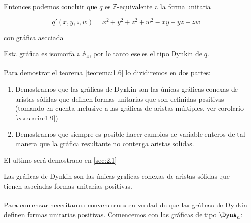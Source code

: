 \begin{example}
Entonces podemos concluir que $q$ es $\mathbb{Z}$-equivalente a la forma unitaria

\begin{equation*}
q'\left(x, y, z, w\right) = x^{2} + y^{2} + z^{2} + w^{2} - xy - yz - zw
\end{equation*}

con gráfica asociada

\begin{center}
\end{center}

Esta gráfica es isomorfa a $\mathbb{A}_{4}$, por lo tanto ese es el tipo Dynkin de $q$.
\end{example}

\paragraph{}
Para demostrar el teorema \ref{teorema:1.6} lo dividiremos en dos partes:

\begin{enumerate}
    \item Demostramos que las gráficas de Dynkin son las únicas gráficas conexas de aristas sólidas que definen formas unitarias que son definidas positivas (tomando en cuenta inclusive a las gráficas de aristas múltiples, ver corolario \ref{corolario:1.9}) .
    \item Demostramos que siempre es posible hacer cambios de variable enteros de tal manera que la gráfica resultante no contenga aristas solidas.
\end{enumerate}

El ultimo será demostrado en \ref{sec:2.1}

\begin{lemma}
Las gráficas de Dynkin son las únicas gráficas conexas de aristas sólidas que tienen asociadas formas unitarias positivas.
\label{lema:1.7}
\end{lemma}

\paragraph{}
Para comenzar necesitamos convencernos en verdad de que las gráficas de Dynkin definen formas unitarias positivas. Comencemos con las gráficas de tipo $\DynA_{n}$:

